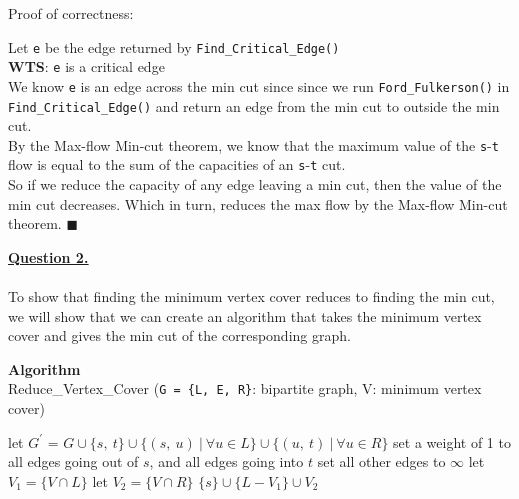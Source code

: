\documentclass[12pt]{article}
\begin{document}
Proof of correctness:
\begin{adjustwidth}{10mm}{}
	Let \texttt{e} be the edge returned by \texttt{Find\_Critical\_Edge()}\\

	\textbf{WTS}: \texttt{e} is a critical edge\\

	We know \texttt{e} is an edge across the min cut since since we run \texttt{Ford\_Fulkerson()}
	in \texttt{Find\_Critical\_Edge()} and return an edge from the min cut to outside the min cut. \\
	By the Max-flow Min-cut theorem, we know that the maximum value of the \texttt{s}-\texttt{t} flow
	is equal to the sum of the capacities of an \texttt{s}-\texttt{t} cut.\\

	So if we reduce the capacity of any edge leaving a min cut, then the value of the min cut decreases.
	Which in turn, reduces the max flow by the Max-flow Min-cut theorem. \hfill $\blacksquare$
\end{adjustwidth}

\newpage
\hyperlink{toc}{\hypertarget{2}{\LARGE \underline{\textbf{Question 2.}}}}\\\\
To show that finding the minimum vertex cover reduces to finding the min cut,
we will show that we can create an algorithm that takes the minimum vertex cover
and gives the min cut of the corresponding graph.\\

\begin{algorithm}
  \caption*{\textbf{Algorithm}\\Reduce\_Vertex\_Cover \big(\texttt{G = \{L, E, R\}}: bipartite graph, V: minimum vertex cover\big)}\label{alg:cap}
	\begin{algorithmic}[1]
    \State let $G^\prime$ = $G \cup \{s,\ t\} \cup \big\{(s,\ u)\ |\ \forall u \in L \big\} \cup \big\{(u,\ t)\ |\ \forall u \in R\big\}$
    \State
    \State set a weight of 1 to all edges going out of $s$, and all edges going into $t$
    \State set all other edges to $\infty$
    \State
    \State let $V_1 = \{V \cap L\}$
    \State let $V_2 = \{V \cap R\}$
    \State
    \State \Return $\{s\} \cup \{L - V_1\} \cup V_2$
	\end{algorithmic}
\end{algorithm}
\end{document}
